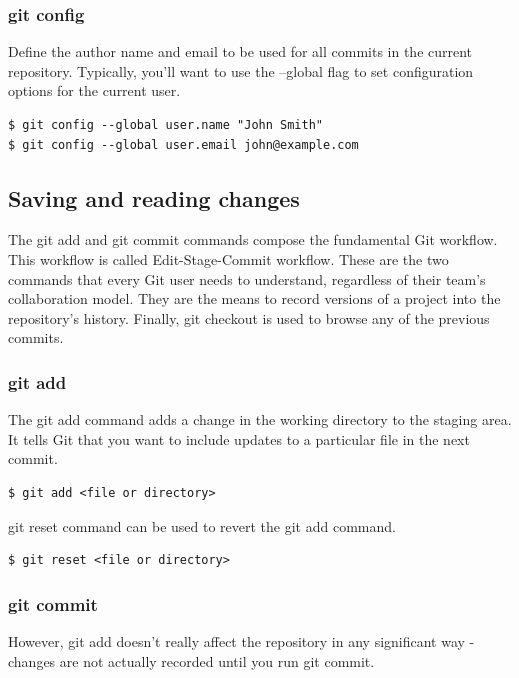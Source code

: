 \documentclass{article}
\begin{document}
\subsubsection*{git config}

Define the author name and email to be used for all commits in the current
repository. Typically, you'll want to use the --global flag to set
configuration options for the current user.

\begin{lstlisting}
$ git config --global user.name "John Smith"
$ git config --global user.email john@example.com 
\end{lstlisting}

\subsection{Saving and reading changes}

The git add and git commit commands compose the fundamental Git
workflow. This workflow is called Edit-Stage-Commit workflow. These
are the two commands that every Git user needs to
understand, regardless of their team's collaboration model. They are
the means to record versions of a project into the repository's
history. Finally, git checkout is used to browse any of the previous
commits.

\subsubsection*{git add}

The git add command adds a change in the working directory to the
staging area. It tells Git that you want to include updates to a
particular file in the next commit. 

\begin{lstlisting}
$ git add <file or directory> 
\end{lstlisting}

git reset command can be used to revert the git add command.

\begin{lstlisting}
$ git reset <file or directory> 
\end{lstlisting}

\subsubsection*{git commit}

However, git add doesn't really
affect the repository in any significant way - changes are not actually
recorded until you run git commit. 
\end{document}
